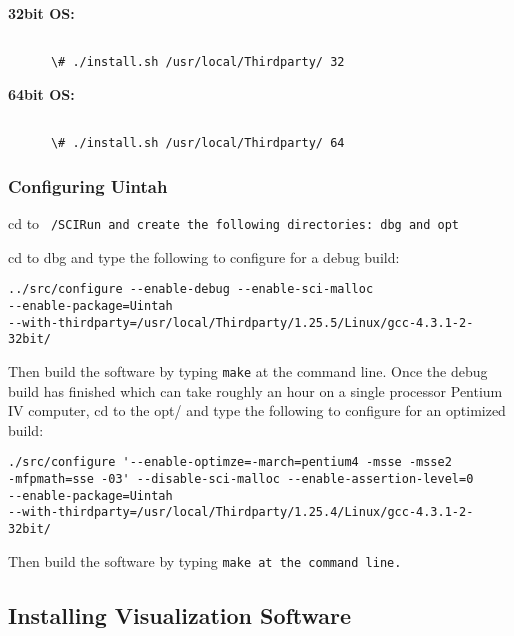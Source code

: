 \textbf{32bit OS:}

\begin{Verbatim}[fontsize=\footnotesize]

      \# ./install.sh /usr/local/Thirdparty/ 32

\end{Verbatim}

\textbf{64bit OS:}


\begin{Verbatim}[fontsize=\footnotesize]

      \# ./install.sh /usr/local/Thirdparty/ 64

\end{Verbatim}


\subsubsection{Configuring Uintah}

cd to \tt ~/SCIRun \normalfont and create the following directories: dbg and opt

cd to dbg and type the following to configure for a debug build:

\begin{Verbatim}[fontsize=\footnotesize]
../src/configure --enable-debug --enable-sci-malloc 
--enable-package=Uintah 
--with-thirdparty=/usr/local/Thirdparty/1.25.5/Linux/gcc-4.3.1-2-32bit/
\end{Verbatim}

Then build the software by typing \texttt{make} at the command
line. Once the debug build has finished which can take roughly an hour
on a single processor Pentium IV computer, cd to the opt/ and type the
following to configure for an optimized build:

\begin{Verbatim}[fontsize=\footnotesize]
./src/configure '--enable-optimze=-march=pentium4 -msse -msse2 
-mfpmath=sse -03' --disable-sci-malloc --enable-assertion-level=0 
--enable-package=Uintah 
--with-thirdparty=/usr/local/Thirdparty/1.25.4/Linux/gcc-4.3.1-2-32bit/
\end{Verbatim}

Then build the software by typing \tt make \normalfont at the command line.

\subsection{Installing Visualization Software}

